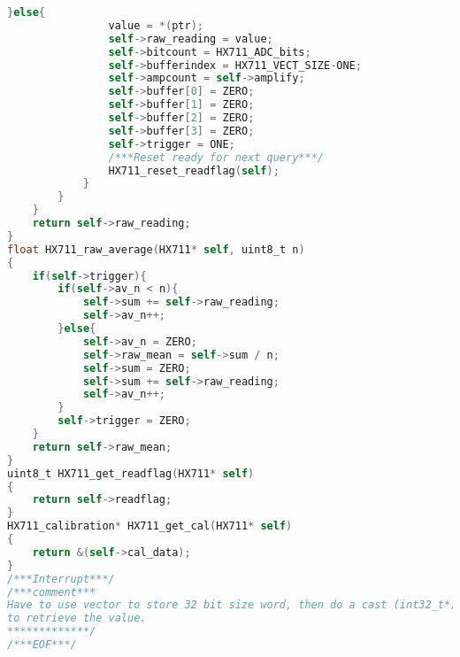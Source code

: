 \begin{lstlisting}[language=C, caption={hx711.c}, label=hx711-c, captionpos=b]
			}else{
				value = *(ptr);
				self->raw_reading = value;
				self->bitcount = HX711_ADC_bits;
				self->bufferindex = HX711_VECT_SIZE-ONE;
				self->ampcount = self->amplify;
				self->buffer[0] = ZERO;
				self->buffer[1] = ZERO;
				self->buffer[2] = ZERO;
				self->buffer[3] = ZERO;
				self->trigger = ONE;
				/***Reset ready for next query***/
				HX711_reset_readflag(self);
			}
		}
	}
	return self->raw_reading;
}
float HX711_raw_average(HX711* self, uint8_t n)
{
	if(self->trigger){
		if(self->av_n < n){
			self->sum += self->raw_reading;
			self->av_n++;
		}else{
			self->av_n = ZERO;
			self->raw_mean = self->sum / n;
			self->sum = ZERO;
			self->sum += self->raw_reading;
			self->av_n++;
		}
		self->trigger = ZERO;
	}
	return self->raw_mean;
}
uint8_t HX711_get_readflag(HX711* self)
{
	return self->readflag;
}
HX711_calibration* HX711_get_cal(HX711* self)
{
	return &(self->cal_data);
}
/***Interrupt***/
/***comment***
Have to use vector to store 32 bit size word, then do a cast (int32_t*)
to retrieve the value.
*************/
/***EOF***/
\end{lstlisting}

